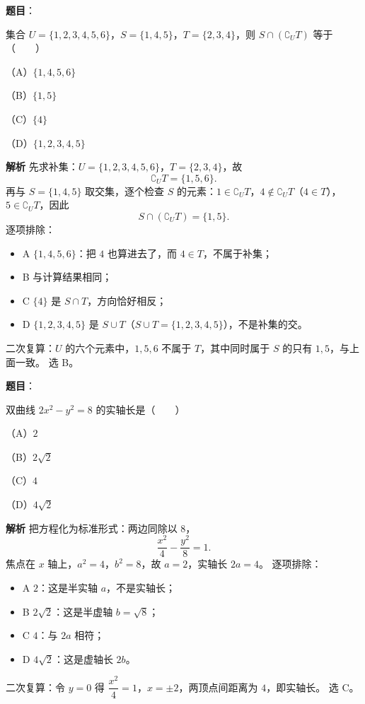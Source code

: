 \begin{answer}

\textbf{题目}：

集合 $U=\{1,2,3,4,5,6\}$，$S=\{1,4,5\}$，$T=\{2,3,4\}$，则 $S\cap(\complement_U T)$ 等于\mbox{（　　）}

（A）$\{1,4,5,6\}$

（B）$\{1,5\}$

（C）$\{4\}$

（D）$\{1,2,3,4,5\}$

\textbf{解析}
先求补集：$U=\{1,2,3,4,5,6\}$，$T=\{2,3,4\}$，故
\nopagebreak[4]
\[
\complement_U T=\{1,5,6\}.
\]
再与 $S=\{1,4,5\}$ 取交集，逐个检查 $S$ 的元素：$1\in\complement_U T$，$4\notin\complement_U T$（$4\in T$），$5\in\complement_U T$，因此
\nopagebreak[4]
\[
S\cap(\complement_U T)=\{1,5\}.
\]
逐项排除：
\begin{itemize}
\item A $\{1,4,5,6\}$：把 $4$ 也算进去了，而 $4\in T$，不属于补集；
\item B 与计算结果相同；
\item C $\{4\}$ 是 $S\cap T$，方向恰好相反；
\item D $\{1,2,3,4,5\}$ 是 $S\cup T$（$S\cup T=\{1,2,3,4,5\}$），不是补集的交。
\end{itemize}
二次复算：$U$ 的六个元素中，$1,5,6$ 不属于 $T$，其中同时属于 $S$ 的只有 $1,5$，与上面一致。
选 B。


\end{answer}
\begin{answer}

\textbf{题目}：

双曲线 $2x^2-y^2=8$ 的实轴长是\mbox{（　　）}

（A）$2$

（B）$2\sqrt2$

（C）$4$

（D）$4\sqrt2$

\textbf{解析}
把方程化为标准形式：两边同除以 $8$，
\nopagebreak[4]
\[
\frac{x^2}{4}-\frac{y^2}{8}=1.
\]
焦点在 $x$ 轴上，$a^2=4$，$b^2=8$，故 $a=2$，实轴长 $2a=4$。
逐项排除：
\begin{itemize}
\item A $2$：这是半实轴 $a$，不是实轴长；
\item B $2\sqrt2$：这是半虚轴 $b=\sqrt8$；
\item C $4$：与 $2a$ 相符；
\item D $4\sqrt2$：这是虚轴长 $2b$。
\end{itemize}
二次复算：令 $y=0$ 得 $\dfrac{x^2}{4}=1$，$x=\pm2$，两顶点间距离为 $4$，即实轴长。
选 C。


\end{answer}
